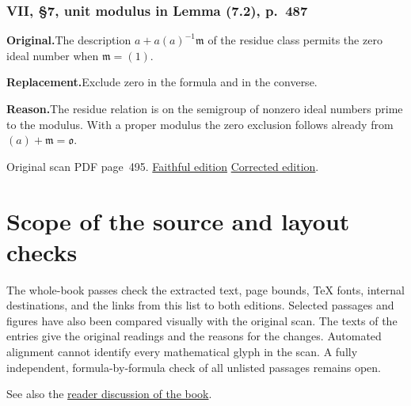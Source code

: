 \documentclass[11pt,a4paper]{article}
\newcommand{\original}{\par\smallskip\noindent\textbf{Original.}\enspace}
\newcommand{\replacement}{\par\smallskip\noindent\textbf{Replacement.}\enspace}
\newcommand{\reason}{\par\smallskip\noindent\textbf{Reason.}\enspace}
\newcommand{\editionlink}[3]{\href{#1\#errata.#2}{#3}}
\newcommand{\location}[2]{%
  \par\smallskip\noindent Original scan PDF page~#2.\enspace
  \editionlink{Neukirch_Faithful.pdf}{#1}{Faithful edition}
  \quad\editionlink{Neukirch_Corrected.pdf}{#1}{Corrected edition}.}
\begin{document}
\section{VII, \S7, unit modulus in Lemma (7.2), p.~487}\label{errata:item:216}

\original The description $a+a(a)^{-1}\mathfrak m$ of the residue class permits the zero ideal number when $\mathfrak m=(1)$.
\replacement Exclude zero in the formula and in the converse.
\reason The residue relation is on the semigroup of nonzero ideal numbers prime to the modulus. With a proper modulus the zero exclusion follows already from $(a)+\mathfrak m=\mathfrak o$.
\location{216}{495}

\part{Scope of the source and layout checks}
The whole-book passes check the extracted text, page bounds, TeX fonts, internal destinations, and the links from this list to both editions. Selected passages and figures have also been compared visually with the original scan. The texts of the entries give the original readings and the reasons for the changes. Automated alignment cannot identify every mathematical glyph in the scan. A fully independent, formula-by-formula check of all unlisted passages remains open.

\medskip
\noindent See also the \href{https://mathoverflow.net/questions/48759/has-anyone-found-an-error-in-an-early-version-of-neukirch}{reader discussion of the book}.
\end{document}
